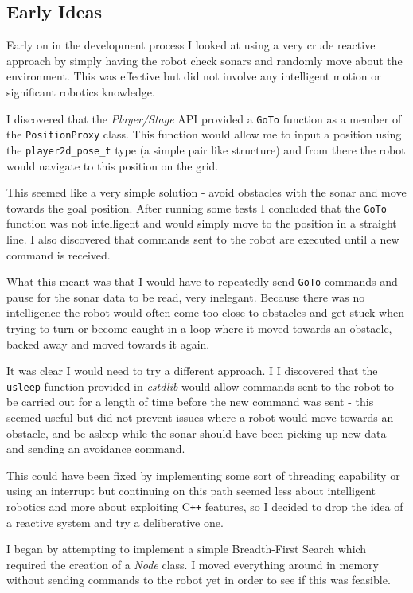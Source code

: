 \documentclass[a4paper,12pt]{article}
\begin{document}
\subsection{Early Ideas}
Early on in the development process I looked at using a very crude reactive approach by simply having the robot check sonars and randomly move about the environment. This was effective but did not involve any intelligent motion or significant robotics knowledge. 

I discovered that the \textit{Player/Stage} API provided a \texttt{GoTo} function as a member of the \texttt{PositionProxy} class. This function would allow me to input a position using the \texttt{player2d\_pose\_t} type (a simple pair like structure) and from there the robot would navigate to this position on the grid.

This seemed like a very simple solution - avoid obstacles with the sonar and move towards the goal position. After running some tests I concluded that the \texttt{GoTo} function was not intelligent and would simply move to the position in a straight line. I also discovered that commands sent to the robot are executed until a new command is received.

What this meant was that I would have to repeatedly send \texttt{GoTo} commands and pause for the sonar data to be read, very inelegant. Because there was no intelligence the robot would often come too close to obstacles and get stuck when trying to turn or become caught in a loop where it moved towards an obstacle, backed away and moved towards it again.

It was clear I would need to try a different approach. I I discovered that the \texttt{usleep} function provided in \textit{cstdlib} would allow commands sent to the robot to be carried out for a length of time before the new command was sent - this seemed useful but did not prevent issues where a robot would move towards an obstacle, and be asleep while the sonar should have been picking up new data and sending an avoidance command.

This could have been fixed by implementing some sort of threading capability or using an interrupt but continuing on this path seemed less about intelligent robotics and more about exploiting C\texttt{++} features, so I decided to drop the idea of a reactive system and try a deliberative one.

I began by attempting to implement a simple Breadth-First Search which required the creation of a \textit{Node} class. I moved everything around in memory without sending commands to the robot yet in order to see if this was feasible. 
\end{document}
